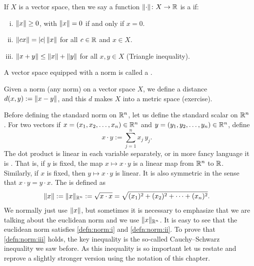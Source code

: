 \begin{defn}
If $X$ is a vector space, then we say
a function $\lVert {\cdot} \rVert \colon X \to {\mathbb{R}}$ is a
\emph{} if:
\begin{enumerate}[(i)]
\item \label{defn:norm:i} $\lVert {x} \rVert \geq 0$, with $\lVert {x} \rVert=0$ if and only if $x=0$.
\item \label{defn:norm:ii} $\lVert {cx} \rVert = \lvert {c} \rvert \, \lVert {x} \rVert$ for all $c \in {\mathbb{R}}$ and $x \in X$.
\item \label{defn:norm:iii} $\lVert {x+y} \rVert \leq \lVert {x} \rVert+\lVert {y} \rVert$ for all $x,y \in X$
\qquad (Triangle inequality).
\end{enumerate}
A vector space equipped with a norm is called a
\emph{}.
\end{defn}

Given a norm (any norm) on a vector space $X$,
we define a distance $d(x,y) := \lVert {x-y} \rVert$, and this
$d$ makes $X$ into a metric space (exercise).


Before defining the standard norm on ${\mathbb{R}}^n$, let us
define the standard 
scalar \emph{} on ${\mathbb{R}}^n$.  For two vectors
if $x=(x_1,x_2,\ldots,x_n) \in {\mathbb{R}}^n$
and $y=(y_1,y_2,\ldots,y_n) \in {\mathbb{R}}^n$, define
\begin{equation*}
x \cdot y := \sum_{j=1}^n x_j\, y_j .
\end{equation*}
The dot product is linear in each variable
separately, or in more fancy language it is \emph{}.
That is,
if $y$ is fixed, the map $x \mapsto x \cdot y$ is a linear map from
${\mathbb{R}}^n$ to ${\mathbb{R}}$.  Similarly, if $x$ is fixed, then
$y \mapsto x \cdot y$ is linear.
It is also symmetric in the sense that $x \cdot y = y \cdot x$.
The \emph{} is defined as
\begin{equation*}
\lVert {x} \rVert := \lVert {x} \rVert_{{\mathbb{R}}^n} := \sqrt{x \cdot x} = \sqrt{(x_1)^2+(x_2)^2 + \cdots + (x_n)^2}.
\end{equation*}
We normally just use $\lVert {x} \rVert$, but sometimes it is necessary to
emphasize that we are talking about the euclidean norm and we use
$\lVert {x} \rVert_{{\mathbb{R}}^n}$.
It is easy to see that the euclidean norm satisfies \ref{defn:norm:i} and
\ref{defn:norm:ii}.  To prove
that \ref{defn:norm:iii} holds, the key
inequality is the so-called Cauchy--Schwarz inequality
we saw before.  As this inequality is so important let us restate and
reprove a slightly stronger version using the notation of this chapter.

